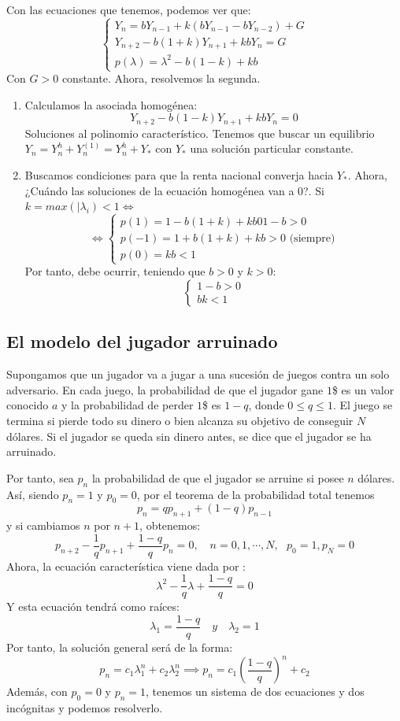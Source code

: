 Con las ecuaciones que tenemos, podemos ver que:
\[
\begin{cases}
	Y_n  = bY _{n-1} + k(b Y _{n-1} - b Y _{n-2}) + G\\
	Y _{n+2} - b(1+k)Y _{n+1} + kb Y_n = G\\
	p(\lambda) = \lambda^2 - b(1-k) +kb
\end{cases}
\]
Con $G > 0 $ constante. Ahora, resolvemos la segunda.
\begin{enumerate}
	\item Calculamos la asociada homogénea:
	 \[
	 Y _{n+2} - b(1-k)Y _{n+1} + kb Y_n = 0
	 \]
	 Soluciones al polinomio característico. Tenemos que buscar un equilibrio $Y_n = Y_n^h + Y_n^{(1)} = Y_n^h + Y_*$ con $Y_*$ una solución particular constante.
	 \item Buscamos condiciones para que la renta nacional converja hacia $Y_*$. Ahora, ¿Cuándo las soluciones de la ecuación homogénea van a 0?. Si $k = max (|\lambda_i) < 1 \iff$
	 \[
	 \iff \begin{cases}
	p(1) = 1-b(1+k) +kb 0 1-b > 0\\
	p(-1) = 1+b(1+k) +kb > 0 \text{ (siempre)}\\
	p(0) = kb < 1
\end{cases}
	 \]
	 Por tanto, debe ocurrir, teniendo que $b> 0 $ y $k > 0$:
	 \[
	 \begin{cases}
	1-b > 0\\
	bk < 1
\end{cases}
	 \]

\end{enumerate}

\subsection{El modelo del jugador arruinado}
Supongamos que un jugador va a jugar a una sucesión de juegos contra un solo adversario. En cada juego, la probabilidad de que el jugador gane $1$\$ es un valor conocido $a$ y la probabilidad de perder $1$\$ es $1-q$, donde $0\leq q \leq 1$. El juego se termina si pierde todo su dinero o bien alcanza su objetivo de conseguir $N$ dólares. Si el jugador se queda sin dinero antes, se dice que el jugador se ha arruinado.

Por tanto, sea $p_n$ la probabilidad de que el jugador se arruine si posee $n$ dólares. Así, siendo $p_n =1$ y $p_0 = 0$, por el teorema de la probabilidad total tenemos
\[
p_n = q p _{n+1} + (1-q) p _{n-1}
\]
y si cambiamos $n$ por $n+1$, obtenemos:
\[
p _{n+2} - \dfrac{1}{q}p _{n+1} + \dfrac{1-q}{q}p_n = 0, \quad n= 0,1,\cdots,N, \ \ \ p_0 = 1, p_N = 0
\]
Ahora, la ecuación característica viene dada por :
\[
\lambda ^2 - \dfrac{1}{q}\lambda + \dfrac{1-q}{q} = 0
\]
Y esta ecuación tendrá como raíces:
\[
\lambda_1 = \dfrac{1-q}{q} \quad y \quad \lambda_2 = 1
\]
Por tanto, la solución general será de la forma:
\[
p_n = c_1 \lambda_1^n + c_2\lambda_2^n \implies p_n= c_1 (\dfrac{1-q}{q})^n + c_2
\]
Además, con $p_0 = 0$ y $p_n = 1$, tenemos un sistema de dos ecuaciones y dos
incógnitas y podemos resolverlo.

